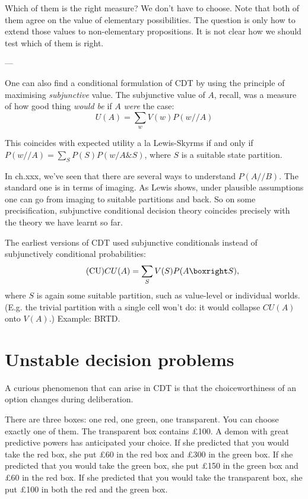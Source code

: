 {  Which of them is the right measure? We don't have to choose. Note
  that both of them agree on the value of elementary
  possibilities. The question is only how to extend those values to
  non-elementary propositions. It is not clear how we should test
  which of them is right.

  ---

  One can also find a conditional formulation of CDT by using the
  principle of maximising \emph{subjunctive} value. The subjunctive
  value of $A$, recall, was a measure of how good thing \emph{would
    be} if $A$ \emph{were} the case:
  \begin{equation}\tag{SV}
    U(A) = \sum_w V(w) P(w // A)
  \end{equation}
  
  This coincides with expected utility a la Lewis-Skyrms if and only
  if $P(w // A) = \sum_S P(S) P(w/ A\& S)$, where $S$ is a suitable
  state partition.
  
  In ch.xxx, we've seen that there are several ways to understand $P(A
  // B)$. The standard one is in terms of imaging. As Lewis shows,
  under plausible assumptions one can go from imaging to suitable
  partitions and back. So on some precisification, subjunctive
  conditional decision theory coincides precisely with the theory we
  have learnt so far.

  The earliest versions of CDT used subjunctive conditionals instead
  of subjunctively conditional probabilities:
  \begin{equation}\tag{CU}
    CU(A) = \sum_S V(S) P(A \boxright S),
  \end{equation}
  where $S$ is again some suitable partition, such as value-level or
  individual worlds. (E.g. the trivial partition with a single cell
  won't do: it would collapse $CU(A)$ onto $V(A)$.) Example: BRTD.
} %


\section{Unstable decision problems}\label{sec:unstable}

A curious phenomenon that can arise in CDT is that the
choiceworthiness of an option changes during deliberation.

\begin{example}
  There are three boxes: one red, one green, one transparent. You can
  choose exactly one of them. The transparent box contains £100. A
  demon with great predictive powers has anticipated your choice. If
  she predicted that you would take the red box, she put £60 in the
  red box and £300 in the green box. If she predicted that you would
  take the green box, she put £150 in the green box and £60 in the red
  box. If she predicted that you would take the transparent box, she
  put £100 in both the red and the green box.
\end{example}

